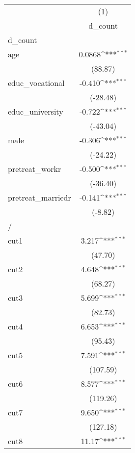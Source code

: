 {
\def\sym#1{\ifmmode^{#1}\else\(^{#1}\)\fi}
\begin{tabular}{l*{1}{c}}
\hline\hline
            &\multicolumn{1}{c}{(1)}\\
            &\multicolumn{1}{c}{d\_count}\\
\hline
d\_count     &                     \\
age         &      0.0868\sym{***}\\
            &     (88.87)         \\
[1em]
educ\_vocational&      -0.410\sym{***}\\
            &    (-28.48)         \\
[1em]
educ\_university&      -0.722\sym{***}\\
            &    (-43.04)         \\
[1em]
male        &      -0.306\sym{***}\\
            &    (-24.22)         \\
[1em]
pretreat\_workr&      -0.500\sym{***}\\
            &    (-36.40)         \\
[1em]
pretreat\_marriedr&      -0.141\sym{***}\\
            &     (-8.82)         \\
\hline
/           &                     \\
cut1        &       3.217\sym{***}\\
            &     (47.70)         \\
[1em]
cut2        &       4.648\sym{***}\\
            &     (68.27)         \\
[1em]
cut3        &       5.699\sym{***}\\
            &     (82.73)         \\
[1em]
cut4        &       6.653\sym{***}\\
            &     (95.43)         \\
[1em]
cut5        &       7.591\sym{***}\\
            &    (107.59)         \\
[1em]
cut6        &       8.577\sym{***}\\
            &    (119.26)         \\
[1em]
cut7        &       9.650\sym{***}\\
            &    (127.18)         \\
[1em]
cut8        &       11.17\sym{***}\\

\end{tabular}}
